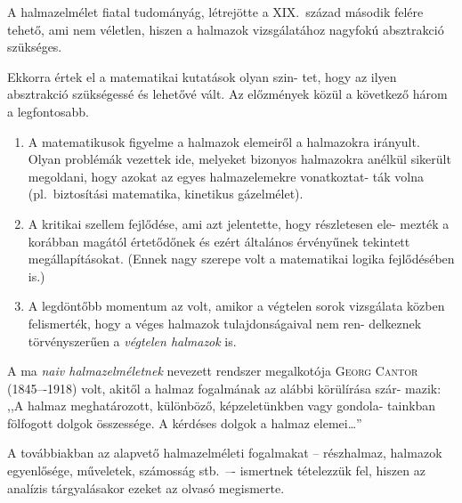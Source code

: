 \documentclass[a4paper,12pt]{article}
\begin{document}
A halmazelmélet fiatal tudományág, létrejötte a XIX.~század második
felére tehető, ami nem véletlen, hiszen a halmazok vizsgálatához nagyfokú
absztrakció szükséges.

Ekkorra értek el a matematikai kutatások olyan szin-
tet, hogy az ilyen absztrakció szükségessé és lehetővé vált. Az előzmények
közül a következő három a legfontosabb.

\begin{enumerate}
\item A matematikusok figyelme a halmazok elemeiről a halmazokra irányult.
Olyan problémák vezettek ide, melyeket bizonyos halmazokra anélkül
sikerült megoldani, hogy azokat az egyes halmazelemekre vonatkoztat-
ták volna (pl.~biztosítási matematika, kinetikus gázelmélet).

\item A kritikai szellem fejlődése, ami azt jelentette, hogy részletesen ele-
mezték a korábban magától értetődőnek és ezért általános érvényűnek
tekintett megállapításokat. (Ennek nagy szerepe volt a matematikai
logika fejlődésében is.)

\item A legdöntőbb momentum az volt, amikor a végtelen sorok vizsgálata
közben felismerték, hogy a véges halmazok tulajdonságaival nem ren-
delkeznek törvényszerűen a \emph{végtelen halmazok} is.
\end{enumerate}

A ma \emph{naiv halmazelméletnek} nevezett rendszer megalkotója \textsc{Georg Cantor}
(1845–-1918) volt, akitől a halmaz fogalmának az alábbi körülírása szár-
mazik: ,,A halmaz meghatározott, különböző, képzeletünkben vagy gondola-
tainkban fölfogott dolgok összessége. A kérdéses dolgok a halmaz elemei\dots''

A továbbiakban az alapvető halmazelméleti fogalmakat -- részhalmaz, halmazok
egyenlősége, műveletek, számosság stb.~–- ismertnek tételezzük fel, hiszen
az analízis tárgyalásakor ezeket az olvasó megismerte.
\end{document}
